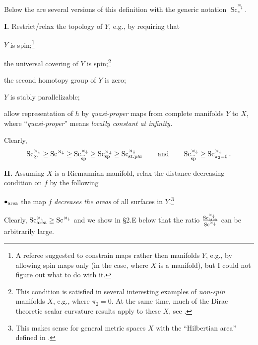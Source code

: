 \documentclass[pdftex]{sigma}
\numberwithin{equation}{section}
\begin{document}
Below the are several versions of this definition with the generic notation $\operatorname{Sc}^{\rtimes_\downarrow}_\ast$.

\textbf{I.} Restrict/relax the topology of $Y$, e.g., by requiring that
\begin{description}\itemsep=0pt\setlength{\leftskip}{0.50cm}
\item[$\bullet_{\rm sp}$] $Y$ is spin;\footnote{A referee suggested to constrain maps
rather then manifolds $Y$, e.g., by allowing spin maps only (in the case, where $X$ is a manifold), but I could not figure out what to do with it.}
\item[$\bullet_{\widetilde{\rm sp}} $] the universal covering of $Y$ is spin;\footnote{This condition is satisfied in several interesting examples of {\it non-spin} manifolds $X$, e.g., where $\pi_2=0 $. At the same time, much of the Dirac theoretic scalar curvature results apply to these $X$, see \cite[Section~$9\frac12$]{Gr1996}.}
\item[$\bullet_{\pi_2=0}$] the second homotopy group of $Y$ is zero;
\item[$\bullet_{\rm st.par}$] $Y$ is stably parallelizable;
\item[$\bullet_{\odot}$] allow representation of $h$
 by {\it quasi-proper} maps from complete manifolds $Y$ to $X$, where ``{\it quasi-proper}'' means {\it locally constant at infinity.}
\end{description}

Clearly,
\begin{gather*}
 \operatorname{Sc}^{\rtimes_\downarrow}_\odot\geq \operatorname{Sc}^{\rtimes_\downarrow}\geq \operatorname{Sc}^{\rtimes_\downarrow} _{\widetilde {\rm sp}} \geq \operatorname{Sc}^{\rtimes_\downarrow} _{\rm sp}\geq
\operatorname{Sc}^{\rtimes_\downarrow} _{\rm st.par} \qquad \text{and}\qquad \operatorname{Sc}^{\rtimes_\downarrow} _{\widetilde{\rm sp}}\geq \operatorname{Sc}^{\rtimes_\downarrow} _{\pi_2=0}.
\end{gather*}

\textbf{II.} Assuming $X$ is a Riemannian manifold, relax the distance decreasing condition on $f$ by the following

$\bullet_{\rm area}$
the map $f$ {\it decreases the areas} of all surfaces in $Y$.\footnote{This makes sense for general metric spaces $X$
with the ``Hilbertian area'' defined in \cite{Gr2018'}.}

Clearly, $\operatorname{Sc}_{\rm area} ^{\rtimes_\downarrow}\geq \operatorname{Sc}^{\rtimes_\downarrow}$ and we show in \S2.E below that the ratio
 $\operatorname{Sc}_{\rm area} ^{\rtimes_\downarrow}\over \operatorname{Sc}^{\rtimes_\downarrow}$ can be arbitrarily large.
\end{document}
